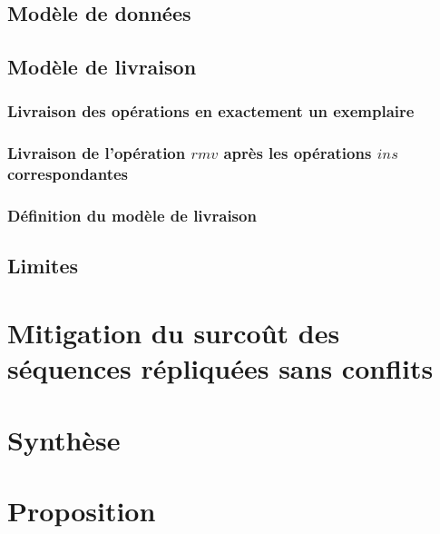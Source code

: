 \documentclass[12pt]{thesul}
\theoremstyle{definition}
\newcommand{\trm}[1]{\mathit{#1}}
\begin{document}
\subsection{Modèle de données}


\subsection{Modèle de livraison}


\subsubsection{Livraison des opérations en exactement un exemplaire}


\subsubsection{Livraison de l'opération $\trm{rmv}$ après les opérations $\trm{ins}$ correspondantes}


\subsubsection{Définition du modèle de livraison}


\subsection{Limites}


\section{Mitigation du surcoût des séquences répliquées sans conflits}


\section{Synthèse}


\section{Proposition}

\end{document}
